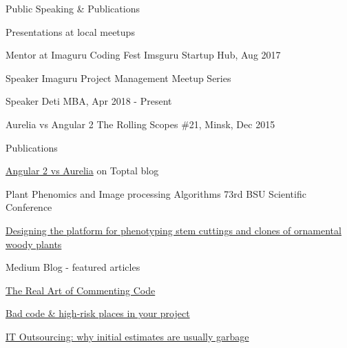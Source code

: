 \documentclass{resume} %
\begin{document}
\begin{rSection}{Public Speaking \& Publications}

    \begin{rSubsection}{Presentations at local meetups}{}{}

    \item Mentor at Imaguru Coding Fest \hfill Imsguru Startup Hub, Aug 2017
    \item Speaker \hfill Imaguru Project Management Meetup Series
    \item Speaker \hfill Deti MBA, Apr 2018 - Present
    \item Aurelia vs Angular 2 \hfill The Rolling Scopes \#21, Minsk, Dec 2015


    \end{rSubsection}

    \begin{rSubsection}{Publications}{}{}

    \item \href{https://www.toptal.com/angular-js/aurelia-vs-angular-2}{Angular 2 vs Aurelia} on Toptal blog
    \item Plant Phenomics and Image processing Algorithms \hfill 73rd BSU Scientific Conference
    \item \href{http://textlab.io/doc/8452214}{Designing the platform for phenotyping stem cuttings and clones of ornamental woody plants}
    \end{rSubsection}


    \begin{rSubsection}{Medium Blog - featured articles}{}{}

    \item \href{https://medium.com/@alexandermikhalchenko/the-real-art-of-commenting-code-1be2d662b2c8}{The Real Art of Commenting Code}
    \item \href{https://medium.com/@alexandermikhalchenko/bad-code-high-risk-places-in-your-project-7fe665eaa5ba}{Bad code & high-risk places in your project}
    \item \href{https://medium.com/@alexandermikhalchenko/it-outsourcing-why-initial-estimates-are-usually-garbage-7aab78f1bf10}{IT Outsourcing: why initial estimates are usually garbage
}
    \end{rSubsection}
\end{rSection}
\end{document}
